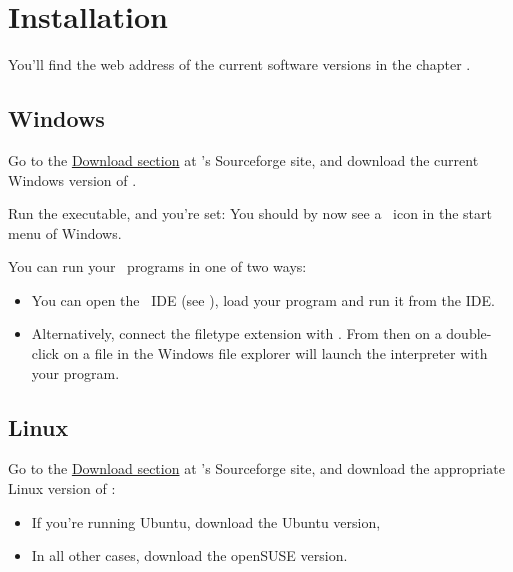 \chapter{Installation}


\absatz

You'll find the web address of the current software versions in the chapter
.

\section{Windows}

Go to the \href{http://smallbasic.sourceforge.net/?q=node/195}{Download
section} at \SB's Sourceforge site, and download the current Windows
version of \SB.

Run the executable, and you're set: You should by now see a \SB\ icon in
the start menu of Windows.

You can run your \SB\ programs in one of two ways:

\begin{itemize}

\item You can open the \SB\
IDE (see ), load your program and run it from the IDE.

\item Alternatively, connect the filetype extension  with \SB. From
then on a double-click on a \Co{.bas} file in the Windows file explorer
will launch the interpreter with your program.

\end{itemize}

\section{Linux \label{installLinux}}

Go to the \href{http://smallbasic.sourceforge.net/?q=node/195}{Download
section} at \SB's Sourceforge site, and download the appropriate Linux 
version of \SB:

\begin{itemize}

\item If you're running Ubuntu, download the Ubuntu version,

\item In all other cases, download the openSUSE version.

\end{itemize}

